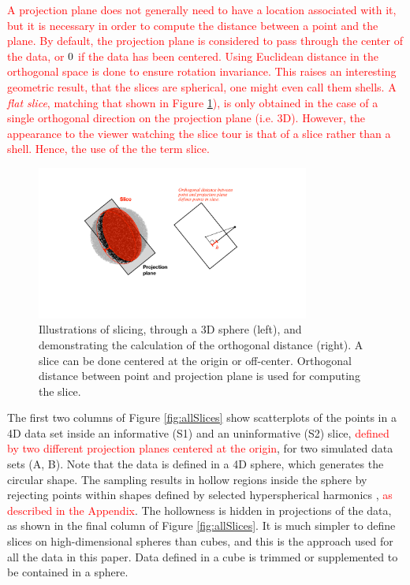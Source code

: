 \documentclass[]{interact}
\theoremstyle{plain}%
\theoremstyle{definition}
\theoremstyle{remark}
\begin{document}
\textcolor{red}{A projection plane does not generally need to have a location associated with it, but it is necessary in order to compute the distance between a point and the plane. By default, the projection plane is considered to pass through the center of the data, or $\boldmath{0}$ if the data has been centered. Using Euclidean distance in the orthogonal space is done to ensure rotation invariance. This raises an interesting geometric result, that the slices are spherical, one might even call them shells. A \textit{flat slice}, matching that shown in Figure \ref{fig:diagrams}), is only obtained in the case of a single orthogonal direction on the projection plane (i.e. 3D). However, the appearance to the viewer watching the slice tour is that of a slice rather than a shell. Hence, the use of the the term slice.}

\begin{figure}[ht]
\centerline{\includegraphics[width=0.8\textwidth]{diagrams/slice.pdf}}
\caption{Illustrations of slicing, through a 3D sphere (left), and demonstrating the calculation of the orthogonal distance (right). A slice can be done centered at the origin or off-center. Orthogonal distance between point and projection plane is used for computing the slice.}
\label{fig:diagrams}
\end{figure}

The first two columns of Figure \ref{fig:allSlices} show scatterplots of
the points in a 4D data set inside an informative (S1) and an
uninformative (S2) slice,
\textcolor{red}{defined by two different projection planes centered at the origin},
for two simulated data sets (A, B). Note that the data is defined in a
4D sphere, which generates the circular shape. The sampling results in
hollow regions inside the sphere by rejecting points within shapes
defined by selected hyperspherical harmonics
\citep{doi:10.1063/1.3054274},
\textcolor{red}{as described in the Appendix}. The hollowness is hidden
in projections of the data, as shown in the final column of Figure
\ref{fig:allSlices}. It is much simpler to define slices on
high-dimensional spheres than cubes, and this is the approach used for
all the data in this paper. Data defined in a cube is trimmed or
supplemented to be contained in a sphere.
\end{document}
